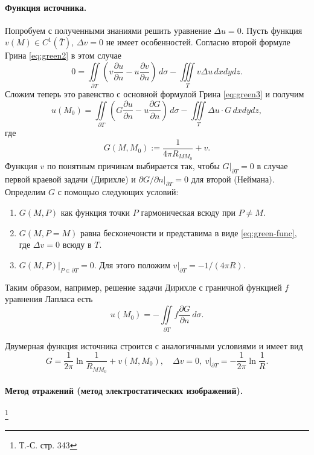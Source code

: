 \paragraph{Функция источника.} Попробуем с полученными знаниями решить уравнение $ \Delta u  = 0 $. Пусть функция $ v(M) \in C^1(\bar T) $, $ \Delta v = 0 $ не имеет особенностей.
Согласно второй формуле Грина \eqref{eq:green2} в этом случае 
\[
  0 = \iint\limits_{\partial T} \left( v \frac{\partial u}{\partial n} - u
  \frac{\partial v}{\partial n} \right) \,d\sigma - \iiint\limits_T v\Delta
  u\,dxdydz. 
\]
Сложим теперь это равенство с основной формулой Грина \eqref{eq:green3}  и
получим 
\[
  u(M_0) = \iint\limits_{\partial T} \left( G \frac{\partial u}{\partial n} - u
  \frac{\partial G}{\partial n}\right) \,d\sigma - \iiint\limits_T \Delta u
  \cdot G\,dxdydz,
\]
где 
\begin{equation}\label{eq:green-func}
  G(M, M_0) := \frac{1}{4\pi R_{MM_0}} + v.
\end{equation}
Функция $ v $ по понятным причинам выбирается так, чтобы $ G|_{\partial T} = 0 $ в случае первой
краевой задачи (Дирихле) и $ \partial G/\partial n |_{\partial T} = 0 $ для
второй (Неймана). Определим $ G $ с помощью следующих условий:
\begin{enumerate}
  \item $G(M, P)$ как функция точки $ P $ гармоническая всюду при $ P \neq M $.
  \item $ G(M, P = M) $ равна бесконечонсти и представима в виде
    \eqref{eq:green-func}, где $ \Delta v = 0 $ всюду в $ T $.
  \item $ G(M, P)|_{P\in\partial T} = 0 $. Для этого положим $ v|_{\partial T} =
    -1/(4\pi R)$.
\end{enumerate}
Таким образом, например, решение задачи Дирихле с граничной функцией $ f $
уравнения Лапласа есть 
\[
  u(M_0) = - \iint\limits_{\partial T} f \frac{\partial G}{\partial n}\,d\sigma.
\]

Двумерная функция источника строится с аналогичными условиями и имеет вид 
\[
  G = \frac{1}{2\pi} \ln \frac{1}{R_{MM_0}} + v(M, M_0), \quad \Delta v = 0, \
  v|_{\partial T} = - \frac{1}{2\pi} \ln \frac{1}{R}.
\]



\paragraph{Метод отражений (метод электростатических изображений).}\footnote{Т.-С. стр. 343}

